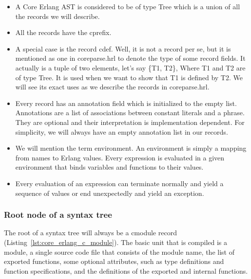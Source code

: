 \begin{itemize}
  \item A Core Erlang AST is considered to be of type Tree which is a union of
    all the records we will describe.
  \item All the records have the c\textunderscore  prefix.
  \item A special case is the record c\textunderscore def. Well, it is not a record per se,
    but it is mentioned as one in core\textunderscore parse.hrl to denote the type of some
    record fields. It actually is a tuple of two elements, let’s say \{T1, T2\},
    Where T1 and T2 are of type Tree. It is used when we want to show that T1
    is defined by T2. We will see its exact uses as we describe the records in
    core\textunderscore parse.hrl.
  \item Every record has an annotation field which is initialized to the empty
    list. Annotations are a list of associations between constant literals and
    a phrase. They are optional and their interpretation is implementation
    dependent. For simplicity, we will always have an empty annotation list in
    our records.
  \item We will mention the term environment. An environment is simply a
    mapping from names to Erlang values. Every expression is evaluated in a
    given environment that binds variables and functions to their values.
  \item Every evaluation of an expression can terminate normally and yield a
    sequence of values or end unexpectedly and yield an exception.
\end{itemize}

\subsubsection{Root node of a syntax tree}


The root of a syntax tree will always be a c\textunderscore module record (Listing~\ref{lst:core_erlang_c_module}). The basic unit that
is compiled is a module, a single source code file that consists of the module
name, the list of exported functions, some optional attributes, such as type
definitions and function specifications, and the definitions of the exported
and internal functions. 

